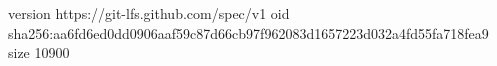 version https://git-lfs.github.com/spec/v1
oid sha256:aa6fd6ed0dd0906aaf59c87d66cb97f962083d1657223d032a4fd55fa718fea9
size 10900
